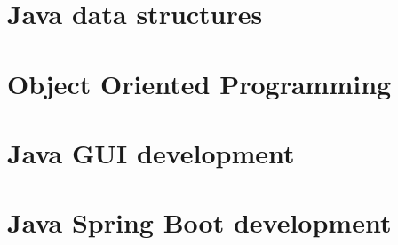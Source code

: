 \documentclass[a4paper,10pt]{book}
\begin{document}
\tableofcontents
\chapter{Java data structures}
\chapter{Object Oriented Programming}
\chapter{Java GUI development}
\chapter{Java Spring Boot development}
\end{document}
